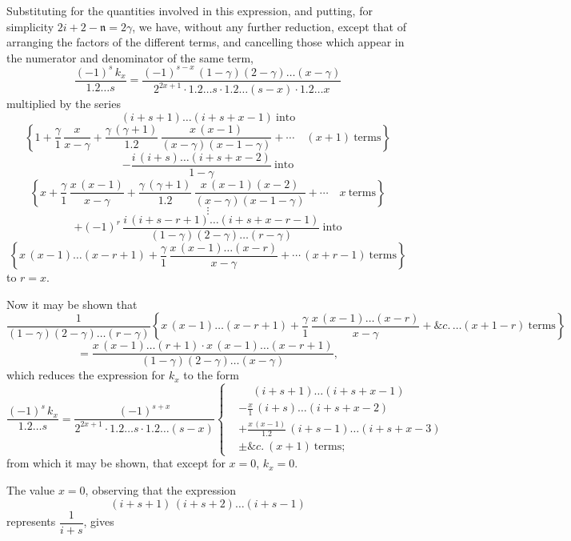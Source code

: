 \documentclass[11pt]{article}
\begin{document}
Substituting for the quantities involved in this expression, and putting, for simplicity $2i + 2 - \mathfrak{n} = 2\gamma$, we have, without any further reduction, except that of arranging the factors of the different terms, and cancelling those which appear in the numerator and denominator of the same term,
\[
\frac{(-1)^{s}\,k_{x}}{1.2\ldots s} = \frac{(-1)^{s-x}\,(1-\gamma)(2-\gamma)\ldots(x-\gamma)}{2^{2x+1}\cdot 1.2\ldots s\cdot 1.2\ldots(s-x)\cdot 1.2\ldots x}
\]
multiplied by the series
\[
(i + s + 1)\ldots(i + s + x - 1)\ \text{into}
\]
\[
\left\{1 + \frac{\gamma}{1}\,\frac{x}{x-\gamma} + \frac{\gamma\,(\gamma+1)}{1.2}\,\frac{x\,(x-1)}{(x-\gamma)(x-1-\gamma)} + \cdots\quad (x+1)\ \text{terms}\right\}
\]
\[
-\frac{i\,(i+s)\ldots(i+s+x-2)}{1-\gamma}\ \text{into}
\]
\[
\left\{x + \frac{\gamma}{1}\,\frac{x\,(x-1)}{x-\gamma} + \frac{\gamma\,(\gamma+1)}{1.2}\,\frac{x\,(x-1)(x-2)}{(x-\gamma)(x-1-\gamma)} + \cdots\quad x\ \text{terms}\right\}
\]
\[
\vdots
\]
\[
+ (-1)^{r}\,\frac{i\,(i+s-r+1)\ldots(i+s+x-r-1)}{(1-\gamma)(2-\gamma)\ldots(r-\gamma)}\ \text{into}
\]
\[
\left\{x\,(x-1)\ldots(x-r+1) + \frac{\gamma}{1}\,\frac{x\,(x-1)\ldots(x-r)}{x-\gamma} + \cdots\,(x + r - 1)\ \text{terms}\right\}
\]
to $r = x$.

\medskip

Now it may be shown that
\[
\frac{1}{(1-\gamma)(2-\gamma)\ldots(r-\gamma)}\left\{x\,(x-1)\ldots(x-r+1) + \frac{\gamma}{1}\,\frac{x\,(x-1)\ldots(x-r)}{x-\gamma} + \&c.\,\ldots(x + 1 - r)\ \text{terms}\right\}
\]
\[
= \frac{x\,(x-1)\ldots(r+1)\cdot x\,(x-1)\ldots(x-r+1)}{(1-\gamma)(2-\gamma)\ldots(x-\gamma)},
\]
which reduces the expression for $k_{x}$ to the form
\[
\frac{(-1)^{s}\,k_{x}}{1.2\ldots s} = \frac{(-1)^{s+x}}{2^{2x+1}\cdot 1.2\ldots s\cdot 1.2\ldots(s-x)}
\left\{
\begin{aligned}
& \phantom{-}(i + s + 1)\ldots(i + s + x - 1) \\
& -\frac{x}{1}\,(i + s)\ldots(i + s + x - 2) \\
& +\frac{x\,(x-1)}{1.2}\,(i + s - 1)\ldots(i + s + x - 3) \\
& \pm \&c.\ (x + 1)\ \text{terms};
\end{aligned}\right.
\]
from which it may be shown, that except for $x = 0$, $k_{x} = 0$.

\medskip

The value $x = 0$, observing that the expression
\[
(i + s + 1)\,(i + s + 2)\ldots(i + s - 1)
\]
represents $\dfrac{1}{i + s}$, gives

\clearpage
\end{document}
